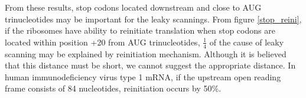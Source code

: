 From these results, stop codons located downstream 
and close to AUG trinucleotides may be important for the leaky scannings.
From figure \ref{stop_reini}, if
the ribosomes have ability to reinitiate translation when stop codons
are located within position +20 from AUG trinucleotides, 
\(\frac{1}{4}\) of the cause of leaky scanning may be explained by
reinitiation mechanism. Although it is believed that this distance
must be short, we cannot suggest the appropriate
distance. In human immunodeficiency virus type 1 mRNA, if the upstream 
open reading frame consists of 84 nucleotides, reinitiation occurs by
50\%\cite{label31}.  



